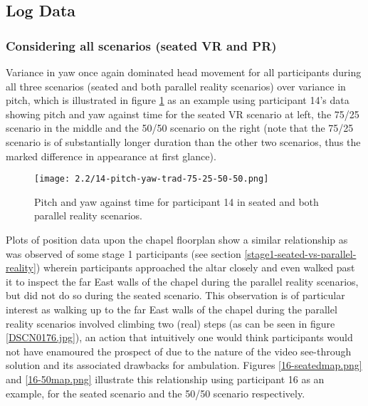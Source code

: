 
\subsection{Log Data}

\subsubsection{Considering all scenarios (seated VR and PR)}

Variance in yaw once again dominated head movement for all participants during all three scenarios (seated and both parallel reality scenarios) over variance in pitch, which is illustrated in figure \ref{14-pitch-yaw-trad-75-25-50-50.png} as an example using participant 14's data showing pitch and yaw against time for the seated VR scenario at left, the 75/25 scenario in the middle and the 50/50 scenario on the right (note that the 75/25 scenario is of substantially longer duration than the other two scenarios, thus the marked difference in appearance at first glance).

\begin{figure}
	\begin{center}
	\texttt{[image: 2.2/14-pitch-yaw-trad-75-25-50-50.png]}
	\caption{Pitch and yaw against time for participant 14 in seated and both parallel reality scenarios.}
	\label{14-pitch-yaw-trad-75-25-50-50.png}
	\end{center}
\end{figure}


Plots of position data upon the chapel floorplan show a similar relationship as was observed of some stage 1 participants (see section \ref{stage1-seated-vs-parallel-reality}) wherein participants approached the altar closely and even walked past it to inspect the far East walls of the chapel during the parallel reality scenarios, but did not do so during the seated scenario. This observation is of particular interest as walking up to the far East walls of the chapel during the parallel reality scenarios involved climbing two (real) steps (as can be seen in figure \ref{DSCN0176.jpg}), an action that intuitively one would think participants would not have enamoured the prospect of due to the nature of the video see-through solution and its associated drawbacks for ambulation. Figures \ref{16-seatedmap.png} and \ref{16-50map.png} illustrate this relationship using participant 16 as an example, for the seated scenario and the 50/50 scenario respectively.

